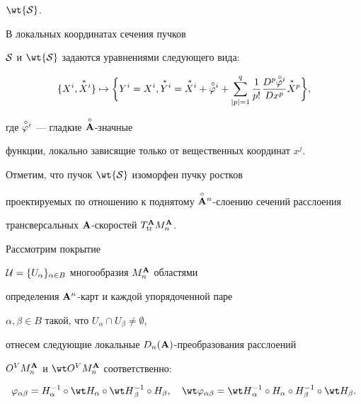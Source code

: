 ${\wt{\cal S}}$.


В локальных координатах сечения пучков


${\cal S}$ и ${\wt{\cal S}}$ задаются уравнениями следующего вида:


\begin{equation}


\label{o.4}


\{X^i, {\puts X}{}^i\} \mapsto


\bigg\{Y^i=X^i,{\puts Y}{}^i=


{\puts X}{}^i+{\puto\varphi}{}^i+


\sum^q_{|p|=1}\frac{1}{p!}


\frac{D^p{\puto\varphi}{}^i}{Dx^p}


{\puts X}{}^p\bigg\},


\end{equation}


где ${\overset{\,\circ}{\varphi}{}}{}^i$ --- гладкие $\overset{\circ}{\bold A}{}$-значные


функции, локально зависящие только от вещественных координат  $x^j$.





Отметим, что пучок ${\wt{\cal S}}$ изоморфен пучку ростков


проектируемых по отношению к поднятому $\overset{\circ}{\bold A}{}^n$-слоению сечений расслоения


трансверсальных ${\bold A}$-скоростей $T^{\bold A}_{\operatorname{tr}}M^{\bold A}_n$.





Рассмотрим покрытие


${\cal U}=\{U_\alpha\}_{\alpha\in B}$ многообразия $M^{\bold A}_n$ областями


определения ${\bold A}^n$-карт и каждой упорядоченной паре


$\alpha,\beta\in B$ такой, что $U_\alpha\cap U_\beta\ne\emptyset$,


отнесем следующие локальные $D_n({\bold A})$-преобразования расслоений


$O^VM^{\bold A}_n$ и $\wt O^VM^\A_n$ соответственно:


\begin{equation}


\label{o.5}


\varphi_{\alpha\beta} = H_{\alpha}^{-1} \circ


\wt H_{\alpha}\circ\wt H{}_{\beta}^{-1} \circ


H_{\beta},\quad


\wt\varphi_{\alpha\beta} = \wt H{}_{\alpha}^{-1} \circ


H_{\alpha}\circ H_{\beta}^{-1} \circ


\wt H_{\beta}.


\end{equation}



